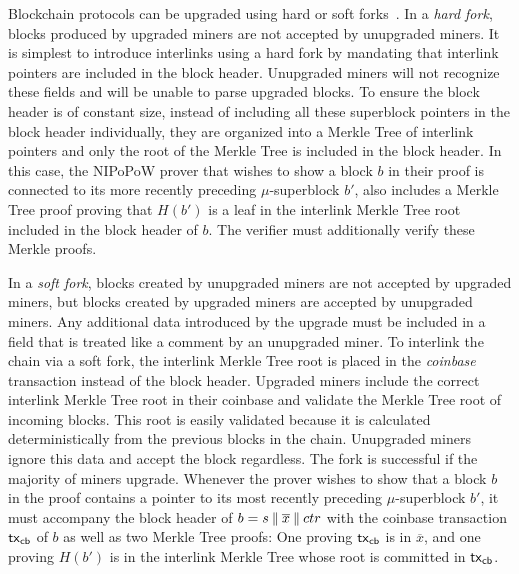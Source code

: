 Blockchain protocols can be upgraded using hard or soft
forks~\cite{buterinforks}. In a \emph{hard fork}, blocks produced by
upgraded miners are not accepted by unupgraded miners. It is simplest to
introduce interlinks using a hard fork by mandating that interlink pointers are
included in the block header. Unupgraded miners will not
recognize these fields and will be unable to parse upgraded blocks.
To ensure the block header is of constant size, instead of including all these
superblock pointers in the block header individually, they are organized into a
Merkle Tree of interlink pointers and only the root of the Merkle Tree is
included in the block header. In this case, the NIPoPoW prover that wishes to
show a block $b$ in their proof is connected to its more recently preceding
$\mu$-superblock $b'$, also includes a Merkle Tree proof proving that $H(b')$ is
a leaf in the interlink Merkle Tree root included in the block header of $b$.
The verifier must additionally verify these Merkle proofs.

In a \emph{soft fork}, blocks created by unupgraded miners are not accepted by
upgraded miners, but blocks created by upgraded miners are accepted by
unupgraded miners. Any additional data introduced by the upgrade must
be included in a field that is treated like a comment by an unupgraded miner.
To interlink the chain via a soft fork, the interlink Merkle Tree root is
placed in the \emph{coinbase} transaction instead of the block header. Upgraded
miners include the correct interlink Merkle Tree root in their coinbase and validate
the Merkle Tree root of incoming blocks.
This root is easily validated because it is
calculated deterministically from the previous blocks in the chain.
Unupgraded miners ignore this data and accept the block
regardless. The fork is successful if the majority of miners upgrade.
Whenever the prover wishes to show that a
block $b$ in the proof contains a pointer to its most recently preceding
$\mu$-superblock $b'$, it must accompany the block header of $b = s \mathbin{\|}
\overline{x} \mathbin{\|} ctr$ with the coinbase transaction $\mathsf{tx}_{\mathsf{cb}}$ of $b$ as well
as two Merkle Tree proofs: One proving $\mathsf{tx}_{\mathsf{cb}}$
is in $\overline{x}$, and one proving $H(b')$ is in the interlink
Merkle Tree whose root is committed in $\mathsf{tx}_{\mathsf{cb}}$.
